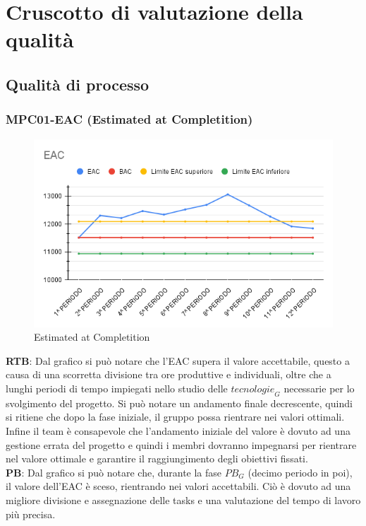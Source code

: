 \section{Cruscotto di valutazione della qualità}
\subsection{Qualità di processo}
\subsubsection{MPC01-EAC (Estimated at Completition)}
\begin{figure}[H]
  \centering
  \includegraphics[width=0.7\linewidth]{grafici/EAC.png}
  \caption{Estimated at Completition}
\end{figure}
\textbf{RTB}: Dal grafico si può notare che l'EAC supera il valore accettabile, questo a causa di una scorretta divisione tra ore produttive e individuali, oltre che a lunghi periodi di tempo impiegati nello studio delle $\textit{tecnologie}_G$ necessarie per lo svolgimento del progetto. Si può notare un andamento finale decrescente, quindi si ritiene che dopo la fase iniziale, il gruppo possa rientrare nei valori ottimali. Infine il team è consapevole che l'andamento iniziale del valore è dovuto ad una gestione errata del progetto e quindi i membri dovranno impegnarsi per rientrare nel valore ottimale e garantire il raggiungimento degli obiettivi fissati. \\
\textbf{PB}: Dal grafico si può notare che, durante la fase $\textit{PB}_G$ (decimo periodo in poi), il valore dell'EAC è sceso, rientrando nei valori accettabili. Ciò è dovuto ad una migliore divisione e assegnazione delle tasks e una valutazione del tempo di lavoro più precisa.

